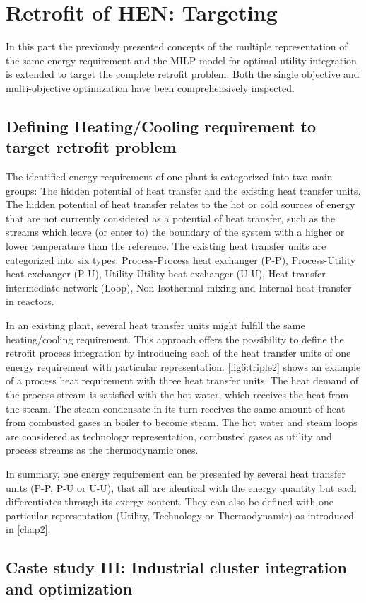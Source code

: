\section{Retrofit of HEN: Targeting}
In this part the previously presented concepts of the multiple representation of the same energy requirement and the MILP model for optimal utility integration is extended to target the complete retrofit problem. Both the single objective and multi-objective optimization have been comprehensively inspected.


\subsection{Defining Heating/Cooling requirement to target retrofit problem}
\label{subsec6:heattransinterface}

The identified energy requirement of one plant is categorized into two main groups: The hidden potential of heat transfer and the existing heat transfer units. The hidden potential of heat transfer relates to the hot or cold sources of energy that are not currently considered as a potential of heat transfer, such as the streams which leave (or enter to) the boundary of the system with a higher or lower temperature than the reference. The existing heat transfer units are categorized into six types: Process-Process heat exchanger (P-P), Process-Utility heat exchanger (P-U), Utility-Utility heat exchanger (U-U), Heat transfer intermediate network (Loop), Non-Isothermal mixing and Internal heat transfer in reactors. 

In an existing plant, several heat transfer units might fulfill the same heating/cooling requirement. This approach offers the possibility to define the retrofit process integration by introducing each of the heat transfer units of one energy requirement with particular representation. \cref{fig6:triple2} shows an example of a process heat requirement with three heat transfer units. The heat demand of the process stream is satisfied with the hot water, which receives the heat from the steam. The steam condensate in its turn receives the same amount of heat from combusted gases in boiler to become steam. The hot water and steam loops are considered as technology representation, combusted gases as utility and process streams as the thermodynamic ones. 

In summary, one energy requirement can be presented by several heat transfer units (P-P, P-U or U-U), that all are identical with the energy quantity but each differentiates through its exergy content. They can also be defined with one particular representation (Utility, Technology or Thermodynamic) as introduced in \cref{chap2}.


\subsection{Caste study III: Industrial cluster integration and optimization}